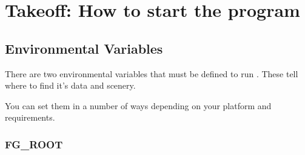 
\chapter{Takeoff: How to start the program\label{takeoff}}


\section{Environmental Variables}

There are two environmental variables that must be defined to run \FlightGear{}. 
These tell \FlightGear{} where to find it's data and scenery.

You can set them in a number of ways depending on your platform and requirements. 

\subsection{FG\_ROOT}

